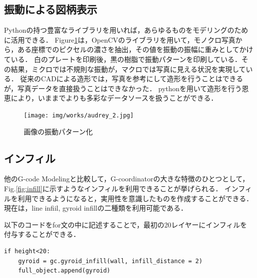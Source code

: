 \documentclass{article}
\begin{document}
\begin{twocolumn}
\begin{itemize}
\subsection{振動による図柄表示}
Pythonの持つ豊富なライブラリを用いれば，あらゆるものをモデリングのために活用できる．
Figure\ref{fig:audrey}は，OpenCVのライブラリを用いて，モノクロ写真から，ある座標でのピクセルの濃さを抽出，その値を振動の振幅に重みとしてかけている．
白のプレートを印刷後，黒の樹脂で振動パターンを印刷している．その結果，ミクロでは不規則な振動が，マクロでは写真に見える状況を実現している．
従来のCADによる造形では，写真を参考にして造形を行うことはできるが，写真データを直接扱うことはできなかった．
pythonを用いて造形を行う恩恵により，いままでよりも多彩なデータソースを扱うことができる．
\begin{figure}[htbp]
  \texttt{[image: img/works/audrey\_2.jpg]}
  \caption{画像の振動パターン化}
  \label{fig:audrey}
\end{figure}

\subsection{インフィル}
他のG-code Modelingと比較して，G-coordinatorの大きな特徴のひとつとして，Fig.\ref{fig:infill}に示すようなインフィルを利用できることが挙げられる．
インフィルを利用できるようになると，実用性を意識したものを作成することができる．
現在は，line infiil, gyroid infillの二種類を利用可能である．

以下のコードをfor文の中に記述することで，最初の20レイヤーにインフィルを付与することができる．
\begin{lstlisting}
if height<20:
    gyroid = gc.gyroid_infill(wall, infill_distance = 2)
    full_object.append(gyroid)
\end{lstlisting}


\end{itemize}
\end{twocolumn}
\end{document}
